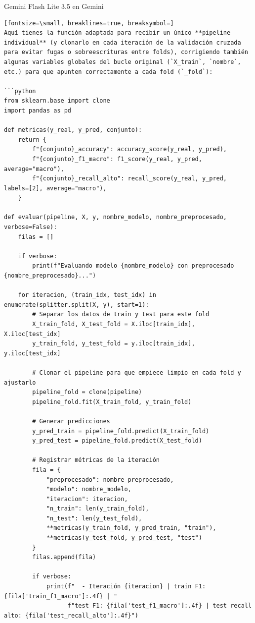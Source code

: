 \documentclass[12pt,a4paper,oneside]{book}
\begin{document}
\begin{iaresp}{Gemini Flash Lite 3.5 en Gemini}
\begin{Verbatim}[fontsize=\small, breaklines=true, breaksymbol=]
Aquí tienes la función adaptada para recibir un único **pipeline individual** (y clonarlo en cada iteración de la validación cruzada para evitar fugas o sobreescrituras entre folds), corrigiendo también algunas variables globales del bucle original (`X_train`, `nombre`, etc.) para que apunten correctamente a cada fold (`_fold`):

```python
from sklearn.base import clone
import pandas as pd

def metricas(y_real, y_pred, conjunto):
    return {
        f"{conjunto}_accuracy": accuracy_score(y_real, y_pred),
        f"{conjunto}_f1_macro": f1_score(y_real, y_pred, average="macro"),
        f"{conjunto}_recall_alto": recall_score(y_real, y_pred, labels=[2], average="macro"),
    }

def evaluar(pipeline, X, y, nombre_modelo, nombre_preprocesado, verbose=False):
    filas = []
    
    if verbose:
        print(f"Evaluando modelo {nombre_modelo} con preprocesado {nombre_preprocesado}...")
        
    for iteracion, (train_idx, test_idx) in enumerate(splitter.split(X, y), start=1):
        # Separar los datos de train y test para este fold
        X_train_fold, X_test_fold = X.iloc[train_idx], X.iloc[test_idx]
        y_train_fold, y_test_fold = y.iloc[train_idx], y.iloc[test_idx]
        
        # Clonar el pipeline para que empiece limpio en cada fold y ajustarlo
        pipeline_fold = clone(pipeline)
        pipeline_fold.fit(X_train_fold, y_train_fold)
        
        # Generar predicciones
        y_pred_train = pipeline_fold.predict(X_train_fold)
        y_pred_test = pipeline_fold.predict(X_test_fold)
        
        # Registrar métricas de la iteración
        fila = {
            "preprocesado": nombre_preprocesado,
            "modelo": nombre_modelo, 
            "iteracion": iteracion,
            "n_train": len(y_train_fold), 
            "n_test": len(y_test_fold),
            **metricas(y_train_fold, y_pred_train, "train"),
            **metricas(y_test_fold, y_pred_test, "test")
        }
        filas.append(fila)
        
        if verbose:
            print(f"  - Iteración {iteracion} | train F1: {fila['train_f1_macro']:.4f} | "
                  f"test F1: {fila['test_f1_macro']:.4f} | test recall alto: {fila['test_recall_alto']:.4f}")
                  

\end{Verbatim}
\end{iaresp}
\end{document}
